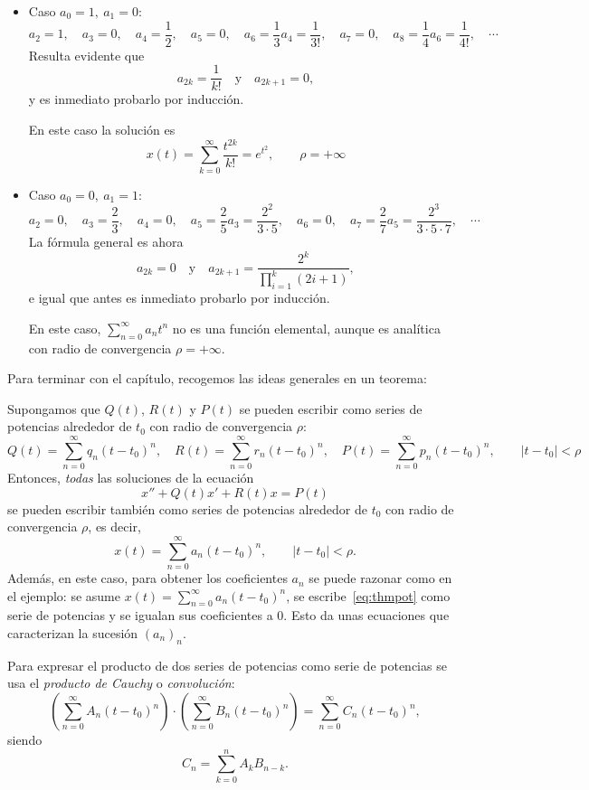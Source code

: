 \documentclass[../ecuaciones_diferenciales.tex]{subfiles}
\begin{document}
\begin{solution}
	\begin{itemize}
		\item Caso \(a_0 = 1,\ a_1 = 0\):
		      \[a_2 = 1, \quad a_3 = 0, \quad a_4 = \frac{1}{2}, \quad a_5 = 0, \quad a_6 =
			      \frac{1}{3}a_4 = \frac{1}{3!}, \quad a_7 = 0, \quad a_8 = \frac{1}{4}a_6 =
			      \frac{1}{4!}, \quad \cdots\]
		      Resulta evidente que
		      \[a_{2k} = \frac{1}{k!} \quad \text{y} \quad a_{2k+1} = 0,\]
		      y es inmediato probarlo por inducción.

		      En este caso la solución es
		      \[x(t) = \sum_{k=0}^\infty \frac{t^{2k}}{k!} = e^{t^2}, \qquad \rho =
			      +\infty\]

		\item Caso \(a_0 = 0,\ a_1 = 1\):
		      \[a_2 = 0, \quad a_3 = \frac{2}{3}, \quad a_4 = 0, \quad a_5 = \frac{2}{5}a_3
			      = \frac{2^2}{3 \cdot 5}, \quad a_6 = 0, \quad a_7 = \frac{2}{7}a_5 =
			      \frac{2^3}{3 \cdot 5 \cdot 7}, \quad \cdots\]
		      La fórmula general es ahora
		      \[a_{2k} = 0 \quad \text{y} \quad a_{2k+1} = \frac{2^k}{\prod_{i=1}^k
				      (2i+1)},\]
		      e igual que antes es inmediato probarlo por inducción.

		      En este caso, \(\sum_{n=0}^\infty a_nt^n\) no es una función
		      elemental, aunque es analítica con radio de
		      convergencia \(\rho = +\infty\).
	\end{itemize}
\end{solution}

Para terminar con el capítulo, recogemos las ideas generales en un teorema:
\begin{theorem}
	Supongamos que \(Q(t)\), \(R(t)\) y \(P(t)\) se pueden escribir como series
	de potencias alrededor de \(t_0\) con radio de convergencia \(\rho\):
	\[Q(t) = \sum_{n=0}^\infty q_n(t-t_0)^n, \quad R(t) = \sum_{n=0}^\infty
		r_n(t-t_0)^n, \quad P(t) = \sum_{n=0}^\infty p_n(t-t_0)^n,
		\qquad |t-t_0| < \rho\]
	Entonces, \emph{todas} las soluciones de la ecuación
	\begin{equation} \label{eq:thmpot}
		x'' + Q(t)x' + R(t)x = P(t)
	\end{equation}
	se pueden escribir también como series de potencias alrededor de
	\(t_0\) con radio de convergencia \(\rho\), es decir,
	\[x(t) = \sum_{n=0}^\infty a_n(t-t_0)^n, \qquad |t-t_0| < \rho.\]
	Además, en este caso, para obtener los coeficientes \(a_n\) se puede razonar
	como en el ejemplo: se asume \(x(t) = \sum_{n=0}^\infty a_n(t-t_0)^n\), se
	escribe~\eqref{eq:thmpot} como serie de potencias y se igualan sus
	coeficientes a 0. Esto da unas ecuaciones que caracterizan la sucesión
	\((a_n)_n\).
\end{theorem}

\begin{remark}
	Para expresar el producto de dos series de potencias como serie de potencias
	se usa el \emph{producto de Cauchy} o \emph{convolución}:
	\[\left( \sum_{n=0}^\infty A_n (t-t_0)^n \right) \cdot
		\left( \sum_{n=0}^\infty B_n (t-t_0)^n \right) =
		\sum_{n=0}^\infty C_n (t-t_0)^n,\]
	siendo
	\[C_n = \sum_{k=0}^n A_kB_{n-k}.\]
\end{remark}
\end{document}

